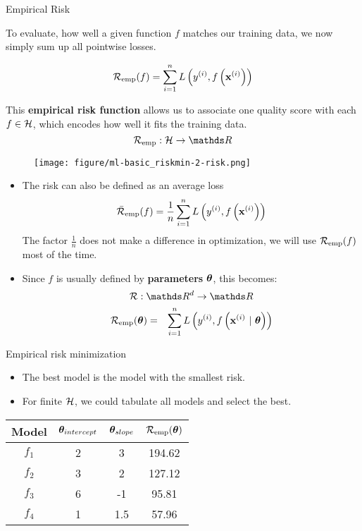 \documentclass[11pt,compress,t,notes=noshow, xcolor=table]{beamer}
\begin{document}
\begin{vbframe}{Empirical Risk}

To evaluate, how well a given function $f$ matches our training data,
we now simply sum up all pointwise losses.
  
$$ \mathcal{R}_{\text{emp}}(f) = \sum\limits_{i=1}^n L\left(y^{(i)}, f\left(\mathbf{x}^{(i)}\right)\right) $$

This \textbf{empirical risk function} allows us
to associate one quality score with each $f \in \mathcal{H}$,
which encodes how well it fits the training data.
$$ \riske:  \Hspace \to \R $$  
\begin{center}
\begin{figure}[!b]
\texttt{[image: figure/ml-basic\_riskmin-2-risk.png]}
\end{figure}
\end{center}

\framebreak 
   
\begin{itemize}
\item The risk can also be defined as an average loss
  $$
    \bar{\mathcal{R}}_{\text{emp}}(f) = \frac{1}{n}\sum\limits_{i=1}^n L\left(y^{(i)}, f\left(\mathbf{x}^{(i)}\right)\right)
  $$
  The factor $\frac{1}{n}$ does not make a difference in optimization, we will use $\mathcal{R}_{\text{emp}}(f)$ most of the time.  
\item Since $f$ is usually defined by \textbf{parameters} $\bm{\theta}$, this becomes:
$$\risk : \R^d \to \R$$
\begin{eqnarray*}
\mathcal{R}_{\text{emp}}(\bm{\theta}) & = & \sum\limits_{i=1}^n L\left(y^{(i)}, f\left(\mathbf{x}^{(i)} ~|~ \bm{\theta}\right)\right) \cr
\end{eqnarray*}
 

\end{itemize}
   
   
\end{vbframe}




\begin{vbframe}{Empirical risk minimization}

\begin{itemize}
    \item The best model is the model with the smallest risk.
    \item For finite $\mathcal{H}$, we could tabulate all models
and select the best.
\end{itemize}

\lz

\begin{center}
\begin{tabular}{ c | c | c || c }
 Model & \(\displaystyle \bm{\theta}_{intercept} \) & \(\displaystyle \bm{\theta}_{slope} \) & \(\displaystyle \mathcal{R}_{\text{emp}}(\bm{\theta}) \) \\ 
 \hline
\(\displaystyle f_1 \)   & 2 & 3 & 194.62 \\
\(\displaystyle f_2 \)   & 3 & 2 & 127.12 \\  
\(\displaystyle f_3 \)   & 6 & -1 & 95.81 \\
\rowcolor{lightgray}
\(\displaystyle f_4 \)   & 1 & 1.5 & 57.96 \\  
\end{tabular}
\end{center}


\end{vbframe}
\end{document}
